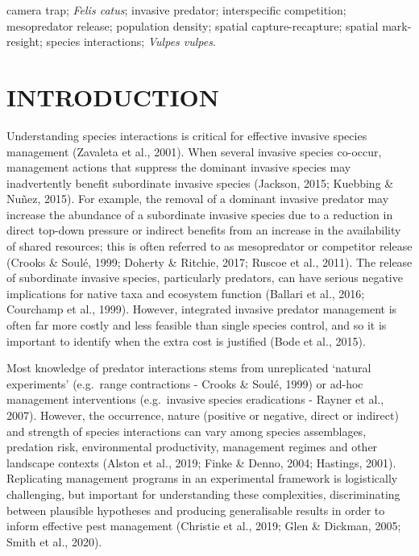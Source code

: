 \documentclass[]{elsarticle} %
\begin{document}
\begin{frontmatter}
\begin{abstract}
\begin{enumerate}
  \end{enumerate}
  \end{abstract}
   \begin{keyword} camera trap; \emph{Felis catus}; invasive predator; interspecific competition; mesopredator release; population density; spatial capture-recapture; spatial mark-resight; species interactions; \emph{Vulpes vulpes}.\end{keyword}
 \end{frontmatter}

\parskip=12pt

\newpage

\hypertarget{introduction}{%
\section{INTRODUCTION}\label{introduction}}

Understanding species interactions is critical for effective invasive species management (Zavaleta et al., 2001). When several invasive species co-occur, management actions that suppress the dominant invasive species may inadvertently benefit subordinate invasive species (Jackson, 2015; Kuebbing \& Nuñez, 2015). For example, the removal of a dominant invasive predator may increase the abundance of a subordinate invasive species due to a reduction in direct top-down pressure or indirect benefits from an increase in the availability of shared resources; this is often referred to as mesopredator or competitor release (Crooks \& Soulé, 1999; Doherty \& Ritchie, 2017; Ruscoe et al., 2011). The release of subordinate invasive species, particularly predators, can have serious negative implications for native taxa and ecosystem function (Ballari et al., 2016; Courchamp et al., 1999). However, integrated invasive predator management is often far more costly and less feasible than single species control, and so it is important to identify when the extra cost is justified (Bode et al., 2015).

Most knowledge of predator interactions stems from unreplicated `natural experiments' (e.g.~range contractions - Crooks \& Soulé, 1999) or ad-hoc management interventions (e.g.~invasive species eradications - Rayner et al., 2007). However, the occurrence, nature (positive or negative, direct or indirect) and strength of species interactions can vary among species assemblages, predation risk, environmental productivity, management regimes and other landscape contexts (Alston et al., 2019; Finke \& Denno, 2004; Hastings, 2001). Replicating management programs in an experimental framework is logistically challenging, but important for understanding these complexities, discriminating between plausible hypotheses and producing generalisable results in order to inform effective pest management (Christie et al., 2019; Glen \& Dickman, 2005; Smith et al., 2020).
\end{document}
